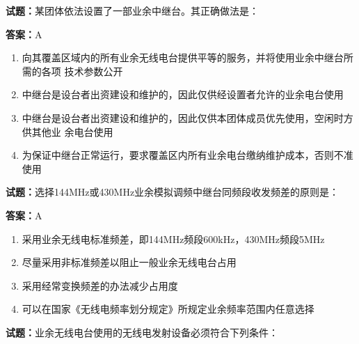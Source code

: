 \documentclass{ctexbook}
\begin{document}
\vspace{1em}

\textbf{试题：}某团体依法设置了一部业余中继台。其正确做法是： 

\textbf{答案：}A 

\begin{enumerate}[leftmargin=3em]
  \item 向其覆盖区域内的所有业余无线电台提供平等的服务，并将使用业余中继台所需的各项
技术参数公开 

  \item 中继台是设台者出资建设和维护的，因此仅供经设置者允许的业余电台使用 

  \item 中继台是设台者出资建设和维护的，因此仅供本团体成员优先使用，空闲时方供其他业
余电台使用 

  \item 为保证中继台正常运行，要求覆盖区内所有业余电台缴纳维护成本，否则不准使用 

\end{enumerate}





\vspace{1em}

\textbf{试题：}选择144MHz或430MHz业余模拟调频中继台同频段收发频差的原则是： 

\textbf{答案：}A 

\begin{enumerate}[leftmargin=3em]
  \item 采用业余无线电标准频差，即144MHz频段600kHz，430MHz频段5MHz 

  \item 尽量采用非标准频差以阻止一般业余无线电台占用 

  \item 采用经常变换频差的办法减少占用度 

  \item 可以在国家《无线电频率划分规定》所规定业余频率范围内任意选择 

\end{enumerate}





\vspace{1em}

\textbf{试题：}业余无线电台使用的无线电发射设备必须符合下列条件： 
\end{document}
